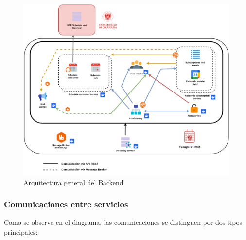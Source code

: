 \begin{figure}[H]
    \centering
    \includegraphics[width=1\textwidth]{figures/06_arq.png}
    \caption{Arquitectura general del Backend}
    \label{fig:backend_architecture}
\end{figure}

\subsubsection{Comunicaciones entre servicios}

Como se observa en el diagrama, las comunicaciones se distinguen por dos tipos principales:

